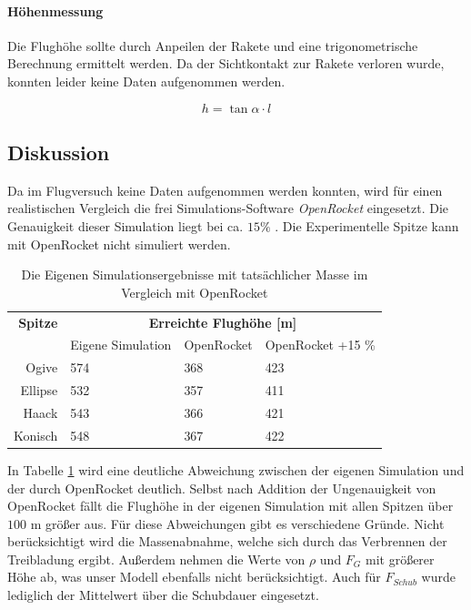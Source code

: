 \documentclass[10pt,a4paper]{article}
\begin{document}
\paragraph{Höhenmessung}
Die Flughöhe sollte durch Anpeilen der Rakete und eine trigonometrische Berechnung ermittelt werden. Da der Sichtkontakt zur Rakete verloren wurde, konnten leider keine Daten aufgenommen werden. 

\[ h = \tan \alpha \cdot l\]


\subsection{Diskussion}

Da im Flugversuch keine Daten aufgenommen werden konnten, wird für einen realistischen Vergleich die frei Simulations-Software \emph{OpenRocket} eingesetzt. Die Genauigkeit dieser Simulation liegt bei ca. $15 \%$ \cite{sn}. Die Experimentelle Spitze kann mit OpenRocket nicht simuliert werden.

\begin{table}
\caption{Die Eigenen Simulationsergebnisse mit tatsächlicher Masse im Vergleich mit OpenRocket}
\label{tab-Simulationsvergleich}
\centering
\begin{tabular}{r|l|ll}
	\toprule
	\textbf{Spitze} & \multicolumn{3}{c}{\textbf{Erreichte Flughöhe [m]}} \\ \cmidrule{2-4}
	& Eigene Simulation	& OpenRocket	& OpenRocket +15 \%	\\
	\midrule
	Ogive		& 574				& 368			& 423 \\
	Ellipse		& 532				& 357			& 411 \\
	Haack		& 543				& 366			& 421 \\
	Konisch		& 548				& 367			& 422 \\
	\bottomrule
\end{tabular}
\end{table}

In Tabelle \ref{tab-Simulationsvergleich} wird eine deutliche Abweichung zwischen der eigenen Simulation und der durch OpenRocket deutlich. Selbst nach Addition der Ungenauigkeit von OpenRocket fällt die Flughöhe in der eigenen Simulation mit allen Spitzen über $100 \text{ m}$ größer aus. Für diese Abweichungen gibt es verschiedene Gründe. Nicht berücksichtigt wird die Massenabnahme, welche sich durch das Verbrennen der Treibladung ergibt. Außerdem nehmen die Werte von $\rho$ und $F_{G}$ mit größerer Höhe ab, was unser Modell ebenfalls nicht berücksichtigt. Auch für $F_{Schub}$ wurde lediglich der Mittelwert über die Schubdauer eingesetzt.
\end{document}
